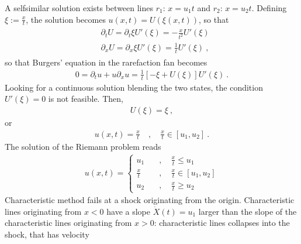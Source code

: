 \documentclass[letterpaper,10pt,english]{jupyterBook}
\begin{document}
\sphinxAtStartPar
{} A self\sphinxhyphen{}similar solution exists between lines \(r_1: \, x = u_1 t\) and \(r_2: \, x = u_2 t\). Defining \(\xi := \frac{x}{t}\), the solution becomes \(u(x, t) = U\left( \xi(x,t) \right)\), so that
\begin{equation*}
\begin{split}\begin{aligned} 
 & \partial_t U = \partial_t \xi U'(\xi) = - \frac{x}{t^2} U'(\xi) \\
 & \partial_x U = \partial_x \xi U'(\xi) =   \frac{1}{t  } U'(\xi) \ ,
\end{aligned}\end{split}
\end{equation*}
\sphinxAtStartPar
so that Burgers’ equation in the rarefaction fan becomes
\begin{equation*}
\begin{split}0 = \partial_t u + u \partial_x u = \frac{1}{t} \left[ - \xi + U(\xi) \right] U'(\xi) \ .\end{split}
\end{equation*}
\sphinxAtStartPar
Looking for a continuous solution blending the two states, the condition \(U'(\xi) = 0\) is not feasible. Then,
\begin{equation*}
\begin{split}U(\xi) = \xi \ ,\end{split}
\end{equation*}
\sphinxAtStartPar
or
\begin{equation*}
\begin{split}u(x,t) = \frac{x}{t} \quad , \quad \frac{x}{t} \in [ u_1 , u_2 ] \ .\end{split}
\end{equation*}
\sphinxAtStartPar
The solution of the Riemann problem reads
\begin{equation*}
\begin{split}u(x,t) = \left\{ \begin{aligned} 
  u_1         \quad & , \quad  \frac{x}{t} \le u_1 \\
  \frac{x}{t} \quad & , \quad  \frac{x}{t} \in [u_1, u_2] \\ 
  u_2         \quad & , \quad  \frac{x}{t} \ge u_2
\end{aligned} \right.\end{split}
\end{equation*}
\sphinxAtStartPar
{} Characteristic method fails at a shock originating from the origin. Characteristic lines originating from \(x < 0\) have a slope \(\dot{X}(t) = u_1\) larger than the slope of the characteristic lines originating from \(x > 0\): characteristic lines collapses into the shock, that has velocity
\end{document}
